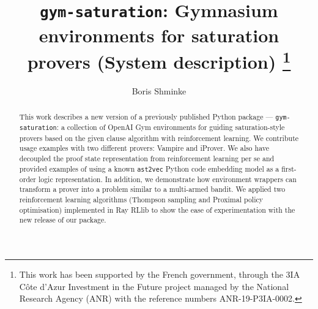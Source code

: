\documentclass[runningheads]{llncs}
\begin{document}
%
\title{\texttt{gym-saturation}: Gymnasium environments for saturation provers (System description) \thanks{This work has been supported by the French government, through the
3IA Côte d’Azur Investment in the Future project managed by the National Research Agency (ANR) with the reference numbers ANR-19-P3IA-0002.}}
%
%
\author{Boris Shminke}
%
%
%
\maketitle              %
%
\begin{abstract}
This work describes a new version of a previously published Python package --- \texttt{gym-saturation}: a collection of OpenAI Gym environments for guiding saturation-style provers based on the given clause algorithm with reinforcement learning. We contribute usage examples with two different provers: Vampire and iProver. We also have decoupled the proof state representation from reinforcement learning per se and provided examples of using a known \texttt{ast2vec} Python code embedding model as a first-order logic representation. In addition, we demonstrate how environment wrappers can transform a prover into a problem similar to a multi-armed bandit. We applied two reinforcement learning algorithms (Thompson sampling and Proximal policy optimisation) implemented in Ray RLlib to show the ease of experimentation with the new release of our package.

\end{abstract}
\end{document}
